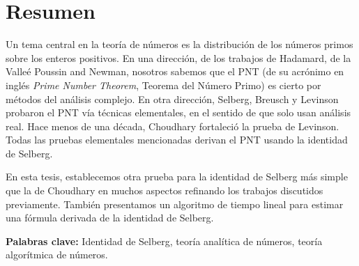 \chapter*{Resumen}
Un tema central en la teor\'ia de n\'umeros es la distribuci\'on
de los n\'umeros primos sobre los enteros positivos.
En una direcci\'on,
de los trabajos de
Hadamard, de la Valle\'e Poussin and Newman,
nosotros sabemos que el PNT
(de su acrónimo en inglés \textit{Prime Number Theorem}, Teorema del N\'umero Primo)
es cierto por m\'etodos del an\'alisis complejo.
En otra direcci\'on,
Selberg, Breusch y Levinson probaron el PNT
v\'ia t\'ecnicas elementales, en el sentido de que solo usan an\'alisis real.
Hace menos de una d\'ecada,
Choudhary fortaleci\'o la prueba de Levinson.
Todas las pruebas elementales mencionadas
derivan el PNT usando la identidad de Selberg.

En esta tesis,
establecemos otra prueba para
la identidad de Selberg
m\'as simple que la de Choudhary en muchos aspectos
refinando los trabajos discutidos previamente.
Tambi\'en presentamos un algoritmo de tiempo lineal
para estimar una f\'ormula derivada de la identidad de Selberg.

\bigskip
\textbf{Palabras clave:}
Identidad de Selberg,
teor\'ia anal\'itica de n\'umeros,
teor\'ia algor\'itmica de n\'umeros.
